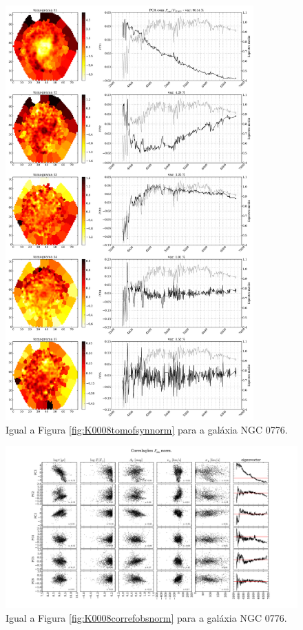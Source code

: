 \begin{figure}
    \includegraphics[width=0.85\textwidth]{figuras/K0073-tomo-syn-norm.pdf}
    \caption[Tomogramas de 1 a 5 para o cubo $F_{syn}$ norm. - NGC 0776.]
    {Igual a Figura \ref{fig:K0008tomofsynnorm} para a galáxia NGC 0776.}
    \label{fig:K0073tomofsynnorm}
\end{figure}

\begin{figure}
    \includegraphics[width=1.3\textwidth, angle=-90]{figuras/K0073-correl-f_obs_norm-PCvsPhys.pdf}
	\caption[Correlações PCs vs. par\^ametros f\'isicos - $F_{obs}$ norm. - NGC 0001]
	{Igual a Figura \ref{fig:K0008correfobsnorm} para a galáxia NGC 0776.}
    \label{fig:K0073correfobsnorm}
\end{figure}

